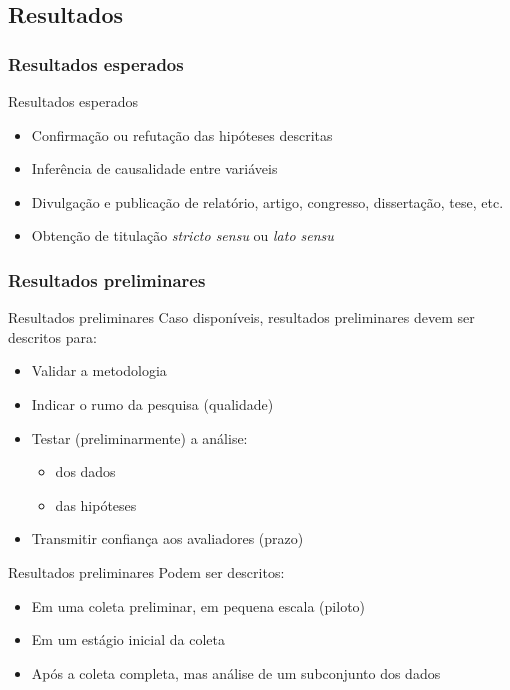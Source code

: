 \documentclass{beamer}
\begin{document}
\subsection{Resultados}

\subsubsection{Resultados esperados}

\begin{frame}{Resultados esperados}
  \begin{itemize}
    \footnotesize
  \item Confirmação ou refutação das hipóteses descritas
  \bigskip
  \item Inferência de causalidade entre variáveis
  \bigskip
  \item Divulgação e publicação de relatório, artigo, congresso,
    dissertação, tese, etc.
  \bigskip
  \item Obtenção de titulação {\em stricto sensu} ou {\em lato sensu}
  \end{itemize}
\end{frame}

\subsubsection{Resultados preliminares}

\begin{frame}{Resultados preliminares}
  \scriptsize
  Caso disponíveis, resultados preliminares devem ser descritos para:
  \bigskip
  \begin{itemize}
    \footnotesize
  \item Validar a metodologia
  \bigskip
  \item Indicar o rumo da pesquisa (qualidade)
  \bigskip
  \item Testar (preliminarmente) a análise:
    \begin{itemize}
      \scriptsize
    \item dos dados
    \item das hipóteses
    \end{itemize}
  \bigskip
  \item Transmitir confiança aos avaliadores (prazo)
  \end{itemize}
\end{frame}

\begin{frame}{Resultados preliminares}
  \scriptsize
  Podem ser descritos:
  \bigskip
  \begin{itemize}
    \footnotesize
  \item Em uma coleta preliminar, em pequena escala (piloto)
  \bigskip
  \item Em um estágio inicial da coleta
  \bigskip
  \item Após a coleta completa, mas análise de um subconjunto dos dados
  \end{itemize}
\end{frame}
\end{document}

